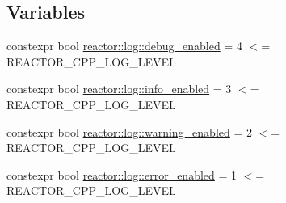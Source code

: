 \subsection*{Variables}
\begin{DoxyCompactItemize}
\item 
constexpr bool \hyperlink{namespacereactor_1_1log_a1391126b1838b59126c9e9d1158a7f55}{reactor\+::log\+::debug\+\_\+enabled} = 4 $<$= R\+E\+A\+C\+T\+O\+R\+\_\+\+C\+P\+P\+\_\+\+L\+O\+G\+\_\+\+L\+E\+V\+EL
\item 
constexpr bool \hyperlink{namespacereactor_1_1log_a3eb2fa07d2ccd17506a05aa3f2f14b2d}{reactor\+::log\+::info\+\_\+enabled} = 3 $<$= R\+E\+A\+C\+T\+O\+R\+\_\+\+C\+P\+P\+\_\+\+L\+O\+G\+\_\+\+L\+E\+V\+EL
\item 
constexpr bool \hyperlink{namespacereactor_1_1log_a88a5f4b17305527201bcb473d079d49d}{reactor\+::log\+::warning\+\_\+enabled} = 2 $<$= R\+E\+A\+C\+T\+O\+R\+\_\+\+C\+P\+P\+\_\+\+L\+O\+G\+\_\+\+L\+E\+V\+EL
\item 
constexpr bool \hyperlink{namespacereactor_1_1log_a1985bfad8d1269e6d3d5e119ce846eef}{reactor\+::log\+::error\+\_\+enabled} = 1 $<$= R\+E\+A\+C\+T\+O\+R\+\_\+\+C\+P\+P\+\_\+\+L\+O\+G\+\_\+\+L\+E\+V\+EL
\end{DoxyCompactItemize}
